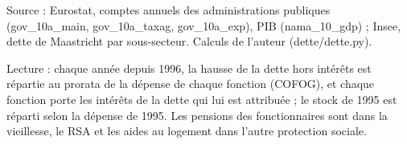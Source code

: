 Source : Eurostat, comptes annuels des administrations publiques (gov\_10a\_main, gov\_10a\_taxag, gov\_10a\_exp), PIB (nama\_10\_gdp) ; Insee, dette de Maastricht par sous-secteur. Calculs de l'auteur (dette/dette.py).\par Lecture : chaque année depuis 1996, la hausse de la dette hors intérêts est répartie au prorata de la dépense de chaque fonction (COFOG), et chaque fonction porte les intérêts de la dette qui lui est attribuée ; le stock de 1995 est réparti selon la dépense de 1995. Les pensions des fonctionnaires sont dans la vieillesse, le RSA et les aides au logement dans l'autre protection sociale.
